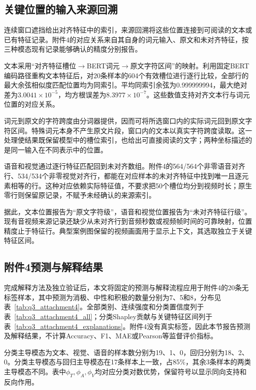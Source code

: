 \subsection{关键位置的输入来源回溯}\label{subsec:q3_grounding}
\QThreeParagraph 连续窗口遮挡给出对齐特征中的索引，来源回溯将这些位置连接到可阅读的文本或已有特征记录。附件4的对应关系来自其自身的词元输入、原文和未对齐特征，按三种模态现有记录能够确认的精度分别报告。

\QThreeParagraph 文本采用“对齐特征槽位$\rightarrow$BERT词元$\rightarrow$原文字符区间”的映射。利用固定BERT编码路径重构文本特征后，对20条样本的604个有效槽位进行逐行比较，全部行的最大余弦相似度匹配位置均为同索引。平均同索引余弦为0.999999994，最大绝对差为$3.0041\times10^{-5}$，均方根误差为$8.3977\times10^{-7}$。这些数值支持对齐文本行与词元位置的对应关系。

\QThreeParagraph 词元到原文的字符跨度由分词器提供，因而可将所选窗口内的实际词元回到原文字符区间。特殊词元本身不产生原文片段，窗口内的文本以真实字符跨度读取。这一处理使结果既保留模型中的槽位索引，也给出可直接阅读的文字；两种坐标描述的是同一输入在不同表示中的位置。

\QThreeParagraph 语音和视觉通过逐行特征匹配回到未对齐数组。附件4的564/564个非零语音对齐行、534/534个非零视觉对齐行，都能在对应样本的未对齐特征中找到唯一且逐元素相等的行。这种对应依赖实际特征值，不要求把50个槽位均分到视频时长；原生零行则保留原记录，不赋予未经确认的来源索引。

\QThreeParagraph 据此，文本位置报告为“原文字符级”，语音和视觉位置报告为“未对齐特征行级”。现有音视频来源记录还缺少从未对齐行到音频秒数或视频帧时间的可靠映射，位置精度止于特征行。典型案例图保留的视频画面用于显示上下文，其选取独立于关键特征区间。

\subsection{附件4预测与解释结果}\label{subsec:q3_attachment4}
\QThreeParagraph 完成解释方法及独立验证后，本文将固定的预测与解释流程应用于附件4的20条无标签样本，其中预测为消极、中性和积极的数量分别为7、5和8，分布见表~\ref{tab:q3_attachment4}。全部类别、连续强度和分类置信度列于表~\ref{tab:q3_attachment4_all}；分类Shapley贡献与关键特征区间列于表~\ref{tab:q3_attachment4_explanations}。附件4没有真实标签，因此本节报告预测及解释结果，不计算Accuracy、F1、MAE或Pearson等监督评价指标。

\QThreeParagraph 分类主导模态为文本、视觉、语音的样本数分别为19、1、0，回归分别为18、2、0。分类主导模态与回归主导模态在17条样本上一致，占85\%，其余3条样本的两类主导模态不同。表中$\phi_T,\phi_A,\phi_V$均对应分类对数优势，保留符号以显示同向支持和反向作用。


